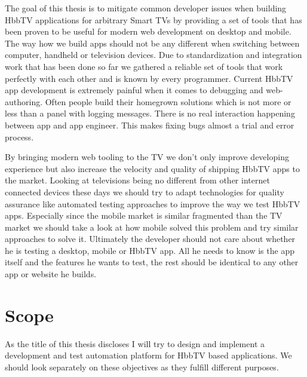 The goal of this thesis is to mitigate common developer issues when building HbbTV applications for arbitrary
Smart TVs by providing a set of tools that has been proven to be useful for modern web development on desktop
and mobile. The way how we build apps should not be any different when switching between computer, handheld or
television devices. Due to standardization and integration work that has been done so far we gathered a reliable
set of tools that work perfectly with each other and is known by every programmer. Current HbbTV app development
is extremely painful when it comes to debugging and web-authoring. Often people build their homegrown solutions
which is not more or less than a panel with logging messages. There is no real interaction happening between app
and app engineer. This makes fixing bugs almost a trial and error process.

By bringing modern web tooling to the TV we don't only improve developing experience but also increase the velocity
and quality of shipping HbbTV apps to the market. Looking at televisions being no different from other internet
connected devices these days we should try to adapt technologies for quality assurance like automated testing
approaches to improve the way we test HbbTV apps. Especially since the mobile market is similar fragmented
than the TV market we should take a look at how mobile solved this problem and try similar approaches to solve
it. Ultimately the developer should not care about whether he is testing a desktop, mobile or HbbTV app. All
he needs to know is the app itself and the features he wants to test, the rest should be identical to any other
app or website he builds.

\section{Scope\label{sec:scope}}

As the title of this thesis discloses I will try to design and implement a development and test automation platform
for HbbTV based applications. We should look separately on these objectives as they fulfill different purposes.

